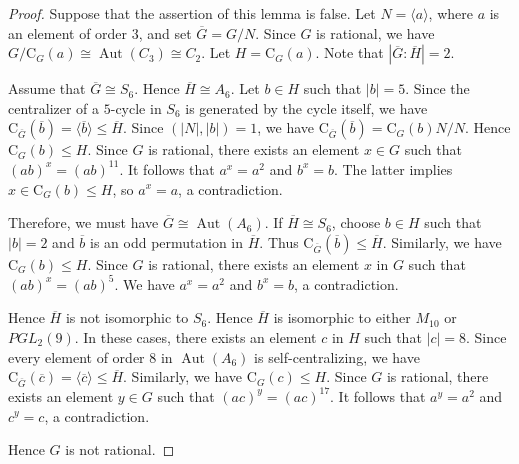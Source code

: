 \documentclass[11pt]{article}
\providecommand{\C}{{\mathrm{C}}}
\providecommand{\Aut}{{\operatorname{Aut}}}
\providecommand{\gen}[1]{\langle #1 \rangle} %
\providecommand{\gen}[1]{\langle #1 \rangle} %
\providecommand{\gen}[1]{\langle #1 \rangle} %
\providecommand{\olb}{{\overline{b}}}
\providecommand{\olc}{{\overline{c}}}
\providecommand{\olG}{{\overline{G}}}
\providecommand{\olH}{{\overline{H}}}
\newtheorem{lem}{Lemma}
\begin{document}
\begin{proof}
    Suppose that the assertion of this lemma is false.
    Let $N=\gen{a}$, where $a$ is an element of order $3$,
    and set $\olG=G/N$.
    Since $G$ is rational, we have $G/\C_G(a)\cong \Aut(C_3)\cong C_2$.
    Let $H =\C_G(a)$. Note that $|\olG:\olH|=2$.

    Assume that $\olG \cong S_6$.
    Hence $\olH \cong A_6$.
    Let $b\in H$ such that $|b|=5$.
    Since the centralizer of a $5$-cycle in $S_6$ is generated by the cycle itself,
    we have $\C_{\olG}(\olb)=\gen{\olb}\leq \olH$.
    Since $(|N|,|b|)=1$, we have $\C_{\olG}(\olb)=\C_G(b)N/N$.
    Hence $\C_G(b)\leq H$.
    Since $G$ is rational, 
    there exists an element $x\in G$ such that $(ab)^x=(ab)^{11}$.
    It follows that $a^x=a^2$ and $b^x=b$.
    The latter implies $x\in \C_G(b)\leq H$, so $a^x=a$, a contradiction.

    Therefore, we must have $\olG \cong \Aut(A_6)$.
    If $\olH \cong S_6$, 
    choose $b\in H$ such that $|b|=2$ and $\olb$ is an odd permutation in $\olH$.
    Thus $\C_{\olG}(\olb)\leq \olH$.
    Similarly, we have $\C_G(b)\leq H$.
    Since $G$ is rational, 
    there exists an element $x$ in $G$ such that $(ab)^x=(ab)^5$.
    We have $a^x=a^2$ and $b^x=b$, a contradiction.
    
    Hence $\olH$ is not isomorphic to $S_6$.
    Hence $\olH$ is isomorphic to either $M_{10}$ or $PGL_2(9)$.
    In these cases, there exists an element $c$ in $H$ such that $|c|=8$.
    Since every element of order $8$ in $\Aut(A_6)$ is self-centralizing,
    we have $\C_{\olG}(\olc)=\gen{\olc}\leq \olH$.
    Similarly, we have $\C_G(c)\leq H$.
    Since $G$ is rational, 
    there exists an element $y\in G$ such that $(ac)^y = (ac)^{17}$.
    It follows that $a^y=a^2$ and $c^y=c$, a contradiction.
    
    Hence $G$ is not rational.
\end{proof}



\end{document}
